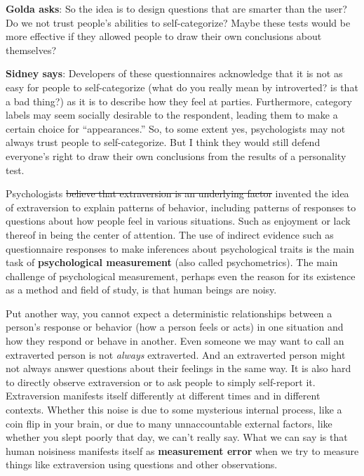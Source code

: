 \documentclass[openany]{book}
\begin{document}
\begin{tipblock}

\textbf{Golda asks}: So the idea is to design questions that are smarter than the user? Do we not trust people's abilities to self-categorize? Maybe these tests would be more effective if they allowed people to draw their own conclusions about themselves?

\textbf{Sidney says}: Developers of these questionnaires acknowledge that it is not as easy for people to self-categorize (what do you really mean by introverted? is that a bad thing?) as it is to describe how they feel at parties. Furthermore, category labels may seem socially desirable to the respondent, leading them to make a certain choice for ``appearances.'' So, to some extent yes, psychologists may not always trust people to self-categorize. But I think they would still defend everyone's right to draw their own conclusions from the results of a personality test.

\end{tipblock}

Psychologists \sout{believe that extraversion is an underlying factor} invented the idea of extraversion to explain patterns of behavior, including patterns of responses to questions about how people feel in various situations. Such as enjoyment or lack thereof in being the center of attention. The use of indirect evidence such as questionnaire responses to make inferences about psychological traits is the main task of \textbf{psychological measurement} (also called psychometrics). The main challenge of psychological measurement, perhaps even the reason for its existence as a method and field of study, is that human beings are noisy.

Put another way, you cannot expect a deterministic relationships between a person's response or behavior (how a person feels or acts) in one situation and how they respond or behave in another. Even someone we may want to call an extraverted person is not \emph{always} extraverted. And an extraverted person might not always answer questions about their feelings in the same way. It is also hard to directly observe extraversion or to ask people to simply self-report it. Extraversion manifests itself differently at different times and in different contexts. Whether this noise is due to some mysterious internal process, like a coin flip in your brain, or due to many unnaccountable external factors, like whether you slept poorly that day, we can't really say. What we can say is that human noisiness manifests itself as \textbf{measurement error} when we try to measure things like extraversion using questions and other observations.
\end{document}
